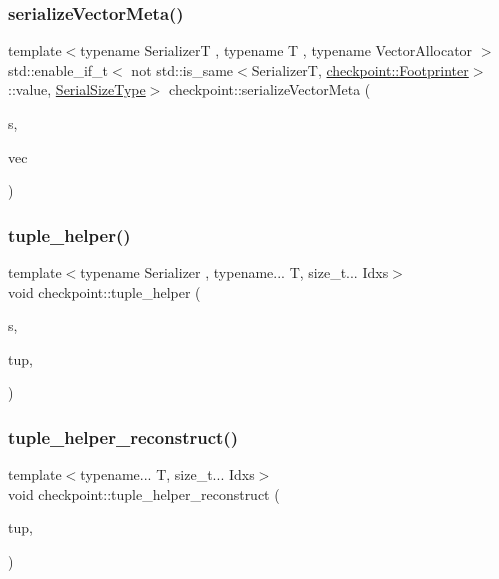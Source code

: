 \subsubsection{\texorpdfstring{serialize\+Vector\+Meta()}{serializeVectorMeta()}}
{\footnotesize\ttfamily template$<$typename SerializerT , typename T , typename Vector\+Allocator $>$ \\
std\+::enable\+\_\+if\+\_\+t$<$ not std\+::is\+\_\+same$<$SerializerT, \hyperlink{structcheckpoint_1_1_footprinter}{checkpoint\+::\+Footprinter}$>$\+::value, \hyperlink{namespacecheckpoint_a083f6674da3f94c2901b18c6d238217c}{Serial\+Size\+Type}$>$ checkpoint\+::serialize\+Vector\+Meta (\begin{DoxyParamCaption}\item[{SerializerT \&}]{s,  }\item[{std\+::vector$<$ T, Vector\+Allocator $>$ \&}]{vec }\end{DoxyParamCaption})}

\mbox{\label{namespacecheckpoint_ab763d3ca9396ff9a1896f5da6c2b3c54}} 
\subsubsection{\texorpdfstring{tuple\+\_\+helper()}{tuple\_helper()}}
{\footnotesize\ttfamily template$<$typename Serializer , typename... T, size\+\_\+t... Idxs$>$ \\
void checkpoint\+::tuple\+\_\+helper (\begin{DoxyParamCaption}\item[{Serializer \&}]{s,  }\item[{std\+::tuple$<$ T... $>$ \&}]{tup,  }\item[{std\+::index\+\_\+sequence$<$ Idxs... $>$}]{ }\end{DoxyParamCaption})}

\mbox{\label{namespacecheckpoint_a8370a2284f01f2fada353a096ab95f4d}} 
\subsubsection{\texorpdfstring{tuple\+\_\+helper\+\_\+reconstruct()}{tuple\_helper\_reconstruct()}}
{\footnotesize\ttfamily template$<$typename... T, size\+\_\+t... Idxs$>$ \\
void checkpoint\+::tuple\+\_\+helper\+\_\+reconstruct (\begin{DoxyParamCaption}\item[{std\+::tuple$<$ T... $>$ $\ast$\&}]{tup,  }\item[{std\+::index\+\_\+sequence$<$ Idxs... $>$}]{ }\end{DoxyParamCaption})}

